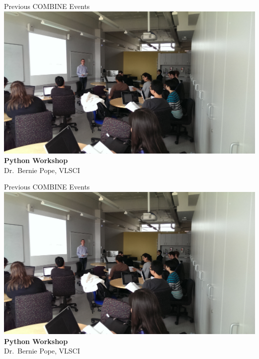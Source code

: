 \documentclass[svgnames]{beamer}
\begin{document}
\begin{frame}{Previous COMBINE Events}
    \centering
    \vfill
    \includegraphics[width=0.95\linewidth]{./images/python-workshop-photo.jpg}\\
    \textbf{Python Workshop}\\
    Dr.~Bernie Pope, VLSCI\\[2ex]
\end{frame}

\begin{frame}{Previous COMBINE Events}
    \centering
    \vfill
    \includegraphics[height=0.8\paperheight]{./images/python-workshop-photo.jpg}\\
    \textbf{Python Workshop}\\
    Dr.~Bernie Pope, VLSCI\\[2ex]
\end{frame}
\end{document}
